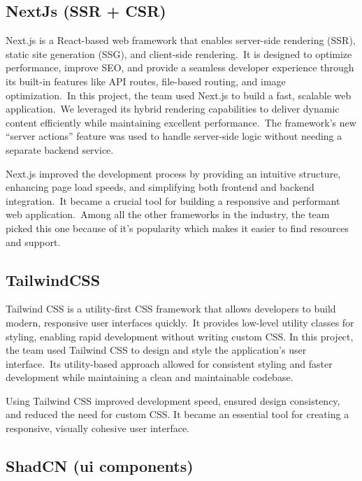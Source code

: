 \subsection{NextJs (SSR + CSR)}\label{subsec:nextjs-(ssr-+-csr)}

Next.js is a React-based web framework that enables server-side rendering (SSR), static site generation (SSG), and client-side rendering.\ It is designed to optimize performance, improve SEO, and provide a seamless developer experience through its built-in features like API routes, file-based routing, and image optimization.\ In this project, the team used Next.js to build a fast, scalable web application.\ We leveraged its hybrid rendering capabilities to deliver dynamic content efficiently while maintaining excellent performance.\ The framework’s new ``server actions'' feature was used to handle server-side logic without needing a separate backend service.\cite[Next.js]{nextjs}

Next.js improved the development process by providing an intuitive structure, enhancing page load speeds, and simplifying both frontend and backend integration.\ It became a crucial tool for building a responsive and performant web application.\ Among all the other frameworks in the industry, the team picked this one because of it's popularity which makes it easier to find resources and support.

\subsection{TailwindCSS}\label{subsec:tailwindcss}

Tailwind CSS is a utility-first CSS framework that allows developers to build modern, responsive user interfaces quickly.\ It provides low-level utility classes for styling, enabling rapid development without writing custom CSS. In this project, the team used Tailwind CSS to design and style the application's user interface.\ Its utility-based approach allowed for consistent styling and faster development while maintaining a clean and maintainable codebase.\cite[TailwindCSS]{tailwind}

Using Tailwind CSS improved development speed, ensured design consistency, and reduced the need for custom CSS. It became an essential tool for creating a responsive, visually cohesive user interface.

\subsection{ShadCN (ui components)}\label{subsec:shadcn-(ui-components)}

